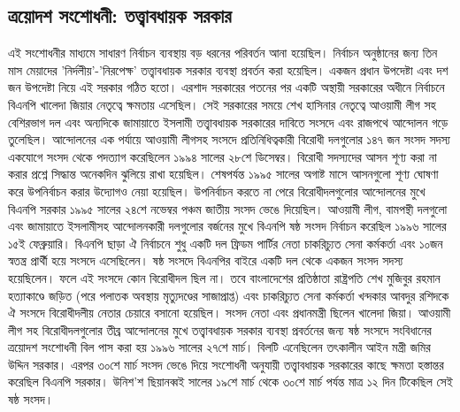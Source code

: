 \documentclass[11pt]{article}
\begin{document}
\subsection{ত্রয়োদশ সংশোধনী: তত্ত্বাবধায়ক সরকার}
\label{sec:org8c61b17}
এই সংশোধনীর মাধ্যমে সাধারণ নির্বাচন ব্যবস্থায় বড় ধরনের পরিবর্তন
আনা হয়েছিল। নির্বাচন অনুষ্ঠানের জন্য তিন মাস মেয়াদের
'নির্দলীয়'-'নিরপেক্ষ' তত্ত্বাবধায়ক সরকার ব্যবস্থা প্রবর্তন করা
হয়েছিল। একজন প্রধান উপদেষ্টা এবং দশ জন উপদেষ্টা নিয়ে এই সরকার
গঠিত হতো। এরশাদ সরকারের পতনের পর একটি অস্থায়ী সরকারের অধীনে
নির্বাচনে বিএনপি খালেদা জিয়ার নেতৃত্বে ক্ষমতায় এসেছিল। সেই
সরকারের সময়ে শেখ হাসিনার নেতৃত্বে আওয়ামী লীগ সহ বেশিরভাগ দল
এবং অন্যদিকে জামায়াতে ইসলামী তত্ত্বাবধায়ক সরকারের দাবিতে সংসদে
এবং রাজপথে আন্দোলন গড়ে তুলেছিল। আন্দোলনের এক পর্যায়ে আওয়ামী
লীগসহ সংসদে প্রতিনিধিত্বকারী বিরোধী দলগুলোর ১৪৭ জন সংসদ সদস্য
একযোগে সংসদ থেকে পদত্যাগ করেছিলেন ১৯৯৪ সালের ২৮শে ডিসেম্বর।
বিরোধী সদস্যদের আসন শূণ্য করা না করার প্রশ্নে সিদ্ধান্ত অনেকদিন
ঝুলিয়ে রাখা হয়েছিল। শেষপর্যন্ত ১৯৯৫ সালের অগাষ্ট মাসে আসনগুলো শূণ্য
ঘোষণা করে উপনির্বাচন করার উদ্যোগও নেয়া হয়েছিল। উপনির্বাচন করতে
না পেরে বিরোধীদলগুলোর আন্দোলনের মুখে বিএনপি সরকার ১৯৯৫ সালের
২৪শে নভেম্বর পঞ্চম জাতীয় সংসদ ভেঙে দিয়েছিল। আওয়ামী লীগ,
বামপন্থী দলগুলো এবং জামায়াতে ইসলামীসহ আন্দোলনকারী দলগুলোর বর্জনের
মুখে বিএনপি ষষ্ঠ সংসদ নির্বাচন করেছিল ১৯৯৬ সালের ১৫ই ফেব্রুয়ারি।
বিএনপি ছাড়া ঐ নির্বাচনে শুধু একটি দল ফ্রিডম পার্টির নেতা চাকরিচ্যুত
সেনা কর্মকর্তা এবং ১০জন স্বতন্ত্র প্রার্থী হয়ে সংসদে এসেছিলেন। ষষ্ঠ
সংসদে বিএনপির বাইরে একটি দল থেকে একজন সংসদ সদস্য হয়েছিলেন।
ফলে এই সংসদে কোন বিরোধীদল ছিল না। তবে বাংলাদেশের প্রতিষ্ঠাতা
রাষ্ট্রপতি শেখ মুজিবুর রহমান হত্যাকাণ্ডে জড়িত (পরে পলাতক অবস্থায়
মৃত্যুদণ্ডের সাজাপ্রাপ্ত) এবং চাকরিচ্যুত সেনা কর্মকর্তা খন্দকার আবদুর
রশিদকে ঐ সংসদে বিরোধীদলীয় নেতার চেয়ারে বসানো হয়েছিল। সংসদ
নেতা এবং প্রধানমন্ত্রী ছিলেন খালেদা জিয়া। আওয়ামী লীগ সহ
বিরোধীদলগুলোর তীব্র আন্দোলনের মুখে তত্ত্বাবধায়ক সরকার ব্যবস্থা
প্রবর্তনের জন্য ষষ্ঠ সংসদে সংবিধানের ত্রয়োদশ সংশোধনী বিল পাস করা
হয় ১৯৯৬ সালের ২৭শে মার্চ। বিলটি এনেছিলেন তৎকালীন আইন মন্ত্রী
জমির উদ্দিন সরকার। এরপর ৩০শে মার্চ সংসদ ভেঙে দিয়ে সংশোধনী
অনুযায়ী তত্ত্বাবধায়ক সরকারের কাছে ক্ষমতা হস্তান্তর করেছিল বিএনপি
সরকার। উনিশ'শ ছিয়ানব্বই সালের ১৯শে মার্চ থেকে ৩০শে মার্চ পর্যন্ত
মাত্র ১২ দিন টিকেছিল সেই ষষ্ঠ সংসদ।
\end{document}

